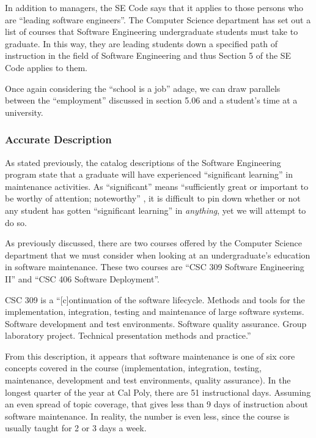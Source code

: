 \documentclass[11pt]{article}
\begin{document}
\begin{multicols}{2}
In addition to managers, the SE Code says that it applies to those persons who are ``leading software engineers''.  The Computer Science department has set out a list of courses that Software Engineering undergraduate students must take to graduate. \cite{catalogDegree}  In this way, they are leading students down a specified path of instruction in the field of Software Engineering and thus Section 5 of the SE Code applies to them.

Once again considering the ``school is a job'' adage, we can draw parallels between the ``employment'' discussed in section 5.06 and a student's time at a university.


\subsubsection{Accurate Description}

As stated previously, the catalog descriptions of the Software Engineering program state that a graduate will have experienced ``significant learning'' in maintenance activities. \cite{catalogDept}  As ``significant'' means ``sufficiently great or important to be worthy of attention; noteworthy'' \cite{definitionSignificant}, it is difficult to pin down whether or not any student has gotten ``significant learning'' in \emph{anything}, yet we will attempt to do so.

As previously discussed, there are two courses offered by the Computer Science department that we must consider when looking at an undergraduate's education in software maintenance.  These two courses are ``CSC 309 Software Engineering II'' and ``CSC 406 Software Deployment''.

CSC 309 is a ``[c]ontinuation of the software lifecycle. Methods and tools for the implementation, integration, testing and maintenance of large software systems. Software development and test environments. Software quality assurance. Group laboratory project. Technical presentation methods and practice.'' \cite{catalogCourses}

From this description, it appears that software maintenance is one of six core concepts covered in the course (implementation, integration, testing, maintenance, development and test environments, quality assurance).  In the longest quarter of the year at Cal Poly, there are 51 instructional days. \cite{polyCalendar}  Assuming an even spread of topic coverage, that gives less than 9 days of instruction about software maintenance.  In reality, the number is even less, since the course is usually taught for 2 or 3 days a week. \cite{309Schedule}


\end{multicols}
\end{document}
